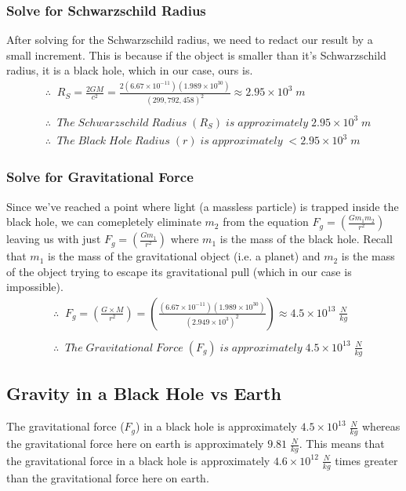 \documentclass{article}
\begin{document}
\subsubsection{Solve for Schwarzschild Radius}
After solving for the Schwarzschild radius, we need to redact our result by a small increment. This is because if the object is smaller than it's Schwarzschild radius, it is a black hole, which in our case, ours is.
\begin{align*}
     & \therefore\;\; R_{S} = \frac{2GM}{c^2} = \frac{2(6.67 \times 10^{-11})(1.989\times 10^{30})}{(299,792,458)^2} \approx 2.95 \times 10^{3} \;m \\\\
     & \therefore\;\; The\; Schwarzschild\; Radius\; (R_{S})\; is\; approximately\; 2.95 \times 10^{3} \;m                                          \\
     & \therefore\;\; The\; Black\; Hole\; Radius\; (r)\; is\; approximately\; < 2.95 \times 10^{3} \;m
\end{align*}\leavevmode

\subsubsection{Solve for Gravitational Force}
Since we've reached a point where light (a massless particle) is trapped inside the black hole, we can comepletely eliminate $m_2$ from the equation $F_g = \left(\frac{Gm_1m_2}{r^2}\right)$ leaving us with just $F_g = \left(\frac{Gm_1}{r^2}\right)$ where $m_1$ is the mass of the black hole. Recall that $m_1$ is the mass of the gravitational object (i.e. a planet) and $m_2$ is the mass of the object trying to escape its gravitational pull (which in our case is impossible).
\begin{align*}
     & \therefore\;\; F_g = \left(\frac{G\times M}{r^2}\right) = \left(\frac{(6.67 \times 10^{-11})(1.989\times 10^{30})}{(2.949 \times 10^{3})^2}\right) \approx 4.5 \times 10^{13} \;\frac{N}{kg} \\\\
     & \therefore\;\; The\; Gravitational\; Force\; (F_g)\; is\; approximately\; 4.5 \times 10^{13} \;\frac{N}{kg}
\end{align*}

\subsection{Gravity in a Black Hole vs Earth}
The gravitational force ($F_g$) in a black hole is approximately $4.5 \times 10^{13}\; \frac{N}{kg}$ whereas the gravitational force here on earth is approximately $9.81\; \frac{N}{kg}$. This means that the gravitational force in a black hole is approximately $4.6 \times 10^{12}\; \frac{N}{kg}$ times greater than the gravitational force here on earth.
\end{document}
